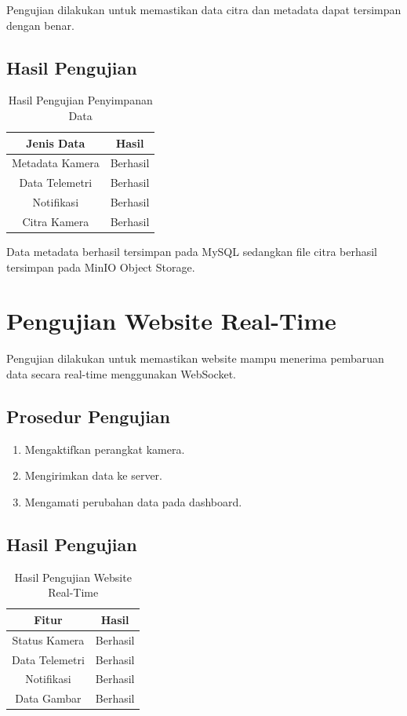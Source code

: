 Pengujian dilakukan untuk memastikan data citra dan metadata dapat tersimpan dengan benar.

\subsection{Hasil Pengujian}

\begin{table}[H]
	\centering
	\caption{Hasil Pengujian Penyimpanan Data}
	\begin{tabular}{|c|c|}
		\hline
		Jenis Data & Hasil \\
		\hline
		Metadata Kamera & Berhasil \\
		Data Telemetri & Berhasil \\
		Notifikasi & Berhasil \\
		Citra Kamera & Berhasil \\
		\hline
	\end{tabular}
\end{table}

Data metadata berhasil tersimpan pada MySQL sedangkan file citra berhasil tersimpan pada MinIO Object Storage.

\section{Pengujian Website Real-Time}

Pengujian dilakukan untuk memastikan website mampu menerima pembaruan data secara real-time menggunakan WebSocket.

\subsection{Prosedur Pengujian}

\begin{enumerate}
	\item Mengaktifkan perangkat kamera.
	\item Mengirimkan data ke server.
	\item Mengamati perubahan data pada dashboard.
\end{enumerate}

\subsection{Hasil Pengujian}

\begin{table}[H]
	\centering
	\caption{Hasil Pengujian Website Real-Time}
	\begin{tabular}{|c|c|}
		\hline
		Fitur & Hasil \\
		\hline
		Status Kamera & Berhasil \\
		Data Telemetri & Berhasil \\
		Notifikasi & Berhasil \\
		Data Gambar & Berhasil \\
		\hline
	\end{tabular}
\end{table}

